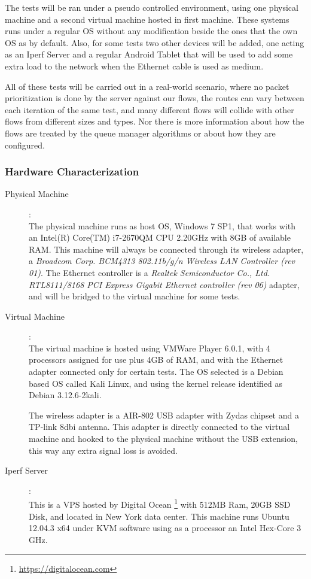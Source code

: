 The tests will be ran under a pseudo controlled environment, using one
physical  machine and a second virtual machine hosted in first machine. These
systems runs under a regular OS without any modification beside the ones that
the own OS as by default. Also, for some tests two other devices will be
added,  one acting as an Iperf Server and a regular Android Tablet that will
be used to add some extra load to the network when the Ethernet cable is used
as medium.

All of these tests will be carried out in a real-world scenario, where no
packet  prioritization is done by the server against our flows, the routes can
vary between each iteration of the same test, and many different flows will
collide with other flows from different sizes and types. Nor there is more
information about how the flows are treated by the queue manager algorithms or
about how they are  configured.

\subsubsection{Hardware Characterization}

\begin{description}

\item [Physical Machine]: \hfill \\
The physical machine runs as host OS, Windows 7 SP1, that works with an Intel(R)
Core(TM) i7-2670QM CPU \@ 2.20GHz with 8GB of available RAM. This machine will 
always be connected through its wireless adapter, a \textit{Broadcom Corp. 
BCM4313 802.11b/g/n Wireless LAN Controller (rev 01)}. The Ethernet controller 
is a \textit{Realtek Semiconductor Co., Ltd. RTL8111/8168 PCI Express Gigabit 
Ethernet controller (rev 06)} adapter, and will be bridged to the virtual 
machine for some tests.

\item[Virtual Machine]: \hfill \\
The virtual machine is hosted using VMWare Player 6.0.1, with 4 processors 
assigned for use plus 4GB of RAM, and with the Ethernet adapter connected only
for certain tests. The OS selected is a Debian based OS called Kali Linux, and
using the kernel release identified as Debian 3.12.6-2kali.

The wireless adapter is a AIR-802 USB adapter with Zydas chipset and a TP-link
8dbi antenna. This adapter is directly connected to the virtual machine and
hooked to the physical machine without the USB extension, this way any extra
signal  loss is avoided. 

\item[Iperf Server]: \hfill \\ 
This is a VPS hosted by Digital Ocean
\footnote{\url{https://digitalocean.com}} with 512MB Ram, 20GB SSD Disk, and
located in New York data center. This machine runs Ubuntu 12.04.3 x64 under
KVM software using as a processor an Intel Hex-Core 3 GHz.

\end{description}

